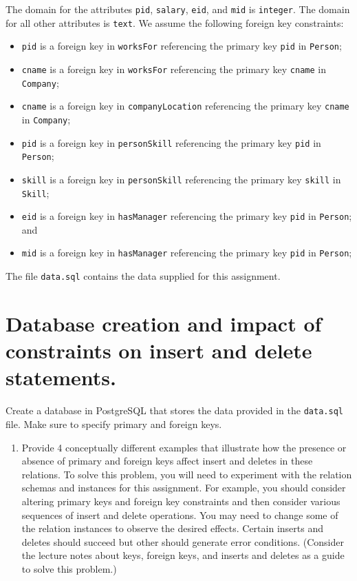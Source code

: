 \documentclass{article}
\begin{document}
The domain for the attributes {\tt pid}, {\tt salary}, {\tt eid}, and {\tt mid} is {\tt integer}.   The domain for all other attributes is {\tt text}.
\newpage
We assume the following foreign key constraints:
\begin{itemize}
\item {\tt pid} is a foreign key in {\tt worksFor} referencing the primary key {\tt pid} in {\tt Person};
\item {\tt cname} is a foreign key in {\tt worksFor} referencing the primary key {\tt cname} in {\tt Company};
\item {\tt cname} is a foreign key in {\tt companyLocation} referencing the primary key {\tt cname} in {\tt Company};
\item {\tt pid} is a foreign key in {\tt personSkill} referencing the primary key {\tt pid} in {\tt Person};
\item {\tt skill} is a foreign key in {\tt personSkill} referencing the primary key {\tt skill} in {\tt Skill};
\item {\tt eid} is a foreign key in {\tt hasManager} referencing the primary key {\tt pid} in {\tt Person}; and
\item {\tt mid} is a foreign key in {\tt hasManager} referencing the primary key {\tt pid} in {\tt Person};

\end{itemize}

The file {\tt data.sql} contains the data supplied for this assignment.

\newpage
\section{Database creation and impact of constraints on insert and delete statements.}

Create a database in PostgreSQL that stores the data provided in the {\tt data.sql} file.
Make sure to specify primary and foreign keys.

\begin{enumerate}
\item Provide 4 conceptually different examples that illustrate how the presence or absence of primary and
  foreign keys affect insert and deletes in these relations.   To solve this problem,
  you will need to experiment with the  relation schemas and instances for this assignment.   
  For example, 
  you should consider altering primary keys and foreign key constraints and
  then consider various sequences of insert and delete operations.   You may need to change some of the
  relation instances to observe the desired effects.
  Certain inserts and deletes should succeed but other should generate error conditions.
  (Consider the lecture notes about keys, foreign keys, and inserts and deletes as a guide to solve this problem.)
  \end{enumerate}
 \newpage
\end{document}
